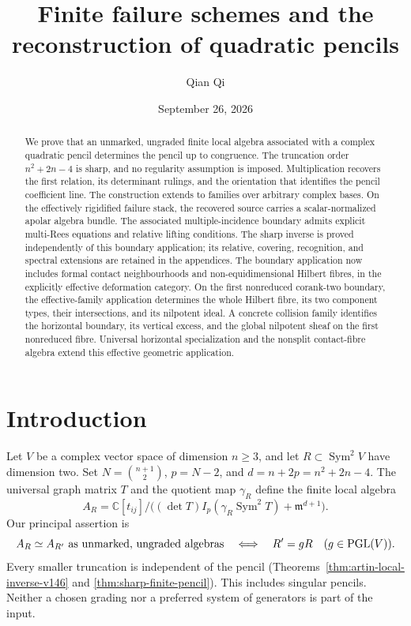 \documentclass[11pt,reqno]{amsart}
\numberwithin{equation}{section}
\theoremstyle{definition}\newtheorem{definition}[theorem]{Definition}
\theoremstyle{remark}\newtheorem{remark}[theorem]{Remark}
\newcommand{\C}{\mathbb C}\newcommand{\Q}{\mathbb Q}
\DeclareMathOperator{\Sym}{Sym}\DeclareMathOperator{\Gr}{Gr}
\begin{document}
\title{Finite failure schemes and the reconstruction of quadratic pencils}
\author{Qian Qi}
\date{September 26, 2026}
\begin{abstract}
We prove that an unmarked, ungraded finite local algebra associated
with a complex quadratic pencil determines the pencil up to congruence.
The truncation order $n^2+2n-4$ is sharp, and no regularity assumption
is imposed. Multiplication recovers the first relation, its determinant
rulings, and the orientation that identifies the pencil coefficient
line. The construction extends to families over arbitrary complex
bases. On the effectively rigidified failure stack, the recovered
source carries a scalar-normalized apolar algebra bundle. The associated
multiple-incidence boundary admits explicit multi-Rees equations and
relative lifting conditions. The sharp inverse is proved independently
of this boundary application; its relative, covering, recognition,
and spectral extensions are retained in the appendices. The boundary application now includes formal
contact neighbourhoods and non-equidimensional Hilbert fibres, in the
explicitly effective deformation category. On the first nonreduced corank-two boundary,
the effective-family application determines the whole Hilbert fibre,
its two component types, their intersections, and its nilpotent ideal. A concrete collision family identifies the
horizontal boundary, its vertical excess, and the global nilpotent
sheaf on the first nonreduced fibre.
Universal horizontal specialization and the nonsplit contact-fibre
algebra extend this effective geometric application.
\end{abstract}
\maketitle
\section{Introduction}
\label{sec:paper-i-v164}\label{sec:paper-i-v166}\label{sec:paper-i-v167}
Let $V$ be a complex vector space of dimension $n\geq3$, and let
$R\subset\Sym^2V$ have dimension two. Set $N=\binom{n+1}{2}$,
$p=N-2$, and $d=n+2p=n^2+2n-4$. The universal graph matrix $T$ and
the quotient map $\gamma_R$ define the finite local algebra
\[
 A_R=\C[t_{ij}]/\bigl((\det T)I_p(\gamma_R\Sym^2T)
                                  +\mathfrak m^{d+1}\bigr).
\]
Our principal assertion is
\[
 A_R\simeq A_{R'}\text{ as unmarked, ungraded algebras}
       \quad\Longleftrightarrow\quad R'=gR\quad(g\in\operatorname{PGL}(V)).
\]
Every smaller truncation is independent of the pencil
(Theorems~\ref{thm:artin-local-inverse-v146} and
\ref{thm:sharp-finite-pencil}). This includes singular pencils.
Neither a chosen grading nor a preferred system of generators is
part of the input.
\end{document}
